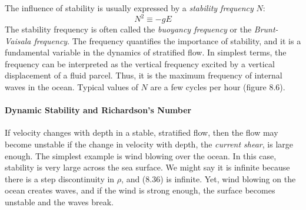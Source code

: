 The influence of stability is usually expressed by a \textit{stability
  frequency} $N$:
\begin{equation}
N^2 \equiv -g E
\end{equation}
The stability frequency is often called the
\textit{buoyancy frequency} or the
\textit{Brunt-Vaisala frequency}. The frequency quantifies the importance of
stability, and it is a fundamental variable in the dynamics of
stratified flow. In simplest terms, the frequency can be interpreted
as the vertical frequency excited by a vertical displacement of a
fluid parcel. Thus, it is the maximum frequency of internal waves in
the ocean. Typical values of $N$ are a few cycles per hour (figure
8.6).

\paragraph{Dynamic Stability and Richardson's Number}
If velocity changes with depth in a stable, stratified flow, then the
flow may become unstable if the change in velocity with depth, the
\textit{current shear}, is large
enough. The simplest example is wind blowing over the ocean. In this
case, stability is very large across the sea surface. We might say it
is infinite because there is a step discontinuity in $\rho$, and
(8.36) is infinite. Yet, wind blowing on the ocean creates waves, and
if the wind is strong enough, the surface becomes unstable and the
waves break.

